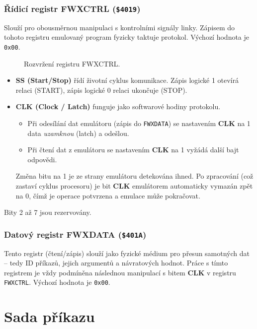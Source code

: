 \label{sec:fwxctrl}
\subsubsection{Řídicí registr FWXCTRL (\texttt{\$4019})}

Slouží pro obousměrnou manipulaci s kontrolními signály linky. Zápisem do tohoto registru emulovaný
program fyzicky taktuje protokol. Výchozí hodnota je \texttt{0x00}.

\begin{figure}[htbp]
    \centering
    
    \caption{Rozvržení registru FWXCTRL.}
\end{figure}

\begin{itemize}
    \item \textbf{SS (Start/Stop)} řídí životní cyklus komunikace. Zápis logické 1 otevírá relaci
        (START), zápis logické 0 relaci ukončuje (STOP).
    \item \textbf{CLK (Clock / Latch)} funguje jako softwarové hodiny protokolu.
        \begin{itemize}
            \item Při odesílání dat emulátoru (zápis do \texttt{FWXDATA}) se nastavením \textbf{CLK} na
                1 data \textit{uzamknou} (latch) a odešlou.
            \item Při čtení dat z emulátoru se nastavením \textbf{CLK} na 1 vyžádá další bajt odpovědi.
        \end{itemize}
    Změna bitu na 1 je ze strany emulátoru detekována ihned. Po zpracování (což zastaví cyklus
    procesoru) je bit \textbf{CLK} emulátorem automaticky vymazán zpět na 0, čímž je operace
    potvrzena a emulace může pokračovat.
\end{itemize}

Bity 2 až 7 jsou rezervovány.

\label{sec:fwxdata}
\subsubsection{Datový registr FWXDATA (\texttt{\$401A})}

Tento registr (čtení/zápis) slouží jako fyzické médium pro přesun samotných dat -- tedy ID příkazů,
jejich argumentů a návratových hodnot. Práce s tímto registrem je vždy podmíněna následnou
manipulací s bitem \textbf{CLK} v registru \texttt{FWXCTRL}. Výchozí hodnota je \texttt{0x00}.

\section{Sada příkazu}

